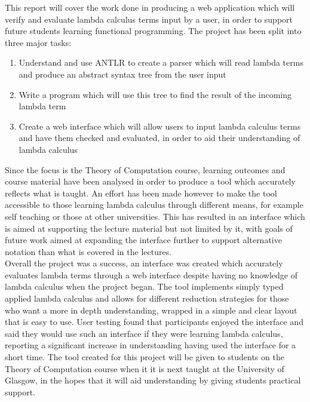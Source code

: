 \documentclass[a4paper,11pt]{report}
\begin{document}
This report will cover the work done in producing a web application which will verify and evaluate lambda calculus terms input by a user, in order to support future students learning functional programming. The project has been split into three major tasks:

\begin{enumerate}
	\item Understand and use ANTLR to create a parser which will read lambda terms and produce an abstract syntax tree from the user input
	\item Write a program which will use this tree to find the result of the incoming lambda term
	\item Create a web interface which will allow users to input lambda calculus terms and have them checked and evaluated, in order to aid their understanding of lambda calculus
\end{enumerate}

Since the focus is the Theory of Computation course, learning outcomes and course material have been analysed in order to produce a tool which accurately reflects what is taught. An effort has been made however to make the tool accessible to those learning lambda calculus through different means, for example self teaching or those at other universities. This has resulted in an interface which is aimed at supporting the lecture material but not limited by it, with goals of future work aimed at expanding the interface further to support alternative notation than what is covered in the lectures.\\

Overall the project was a success, an interface was created which accurately evaluates lambda terms through a web interface despite having no knowledge of lambda calculus when the project began. The tool implements simply typed applied lambda calculus and allows for different reduction strategies for those who want a more in depth understanding, wrapped in a simple and clear layout that is easy to use. User testing found that participants enjoyed the interface and said they would use such an interface if they were learning lambda calculus, reporting a significant increase in understanding having used the interface for a short time. The tool created for this project will be given to students on the Theory of Computation course when it it is next taught at the University of Glasgow, in the hopes that it will aid understanding by giving students practical support.\\
\end{document}
